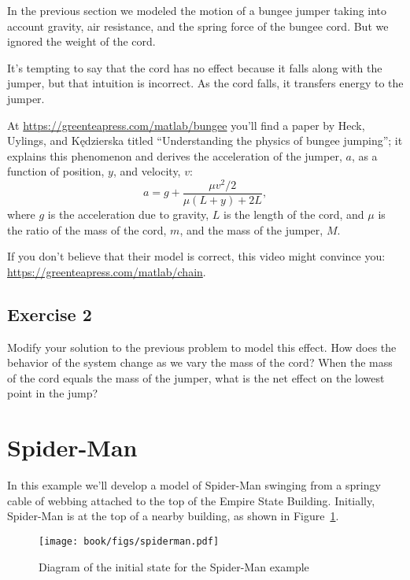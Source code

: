 
In the previous section we modeled the motion of a bungee jumper taking into account gravity, air resistance, and the spring force of the bungee cord.  But we ignored the weight of the cord.


It's tempting to say that the cord has no effect because it falls along with the jumper, but that intuition is incorrect.  As the cord falls, it transfers energy to the jumper.


At \url{https://greenteapress.com/matlab/bungee} you'll find a paper by Heck, Uylings, and Kędzierska titled ``Understanding the physics of bungee jumping''; it explains this phenomenon and derives the acceleration of the jumper, $a$, as a function of position, $y$, and velocity, $v$:
%
\[ a = g + \frac{\mu v^2/2}{\mu(L+y) + 2L}, \] 
%
where $g$ is the acceleration due to gravity, $L$ is the length of the cord, and $\mu$ is the ratio of the mass of the cord, $m$, and the mass of the jumper, $M$.

If you don't believe that their model is correct, this video might convince you: \url{https://greenteapress.com/matlab/chain}.

\subsection{Exercise 2}

Modify your solution to the previous problem to model this effect.  How does the behavior of the system change as we vary the mass of the cord?  When the mass of the cord equals the mass of the jumper, what is the net effect on the lowest point in the jump?


\section{Spider-Man}

In this example we'll develop a model of Spider-Man swinging from a
springy cable of webbing attached to the top of the Empire State
Building.  Initially, Spider-Man is at the top of a nearby building, as
shown in Figure~\ref{spiderman}.


\begin{figure}
\centerline{\texttt{[image: book/figs/spiderman.pdf]}}
\caption{Diagram of the initial state for the Spider-Man example}
\label{spiderman}
\end{figure}

